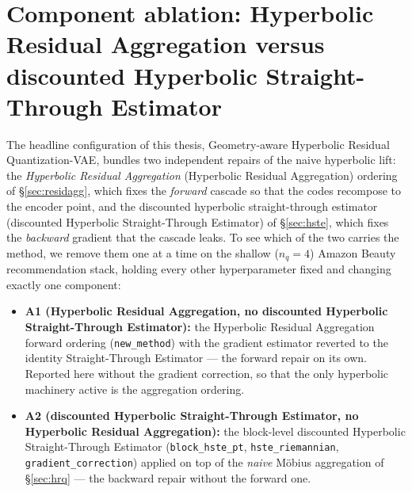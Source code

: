 \documentclass[12pt]{report}
\begin{document}
\section{Component ablation: Hyperbolic Residual Aggregation versus discounted Hyperbolic Straight-Through Estimator}
\label{sec:abl_components}

The headline configuration of this thesis, Geometry-aware Hyperbolic Residual Quantization-VAE, bundles two independent repairs of the naive hyperbolic lift: the \emph{Hyperbolic Residual Aggregation} (Hyperbolic Residual Aggregation) ordering of \S\ref{sec:residagg}, which fixes the \emph{forward} cascade so that the codes recompose to the encoder point, and the discounted hyperbolic straight-through estimator (discounted Hyperbolic Straight-Through Estimator) of \S\ref{sec:hste}, which fixes the \emph{backward} gradient that the cascade leaks. To see which of the two carries the method, we remove them one at a time on the shallow ($n_q=4$) Amazon Beauty recommendation stack, holding every other hyperparameter fixed and changing exactly one component:
\begin{itemize}
  \item \textbf{A1 (Hyperbolic Residual Aggregation, no discounted Hyperbolic Straight-Through Estimator):} the Hyperbolic Residual Aggregation forward ordering (\texttt{new\_method}) with the gradient estimator reverted to the identity Straight-Through Estimator --- the forward repair on its own. Reported here without the gradient correction, so that the only hyperbolic machinery active is the aggregation ordering.
  \item \textbf{A2 (discounted Hyperbolic Straight-Through Estimator, no Hyperbolic Residual Aggregation):} the block-level discounted Hyperbolic Straight-Through Estimator (\texttt{block\_hste\_pt}, \texttt{hste\_riemannian}, \texttt{gradient\_correction}) applied on top of the \emph{naive} M\"obius aggregation of \S\ref{sec:hrq} --- the backward repair without the forward one.
\end{itemize}
\end{document}
